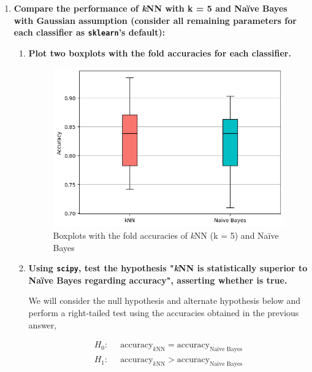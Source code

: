 \documentclass[12pt]{article}
\begin{document}
\begin{enumerate}[leftmargin=\labelsep]
  \item \textbf{Compare the performance of \textit{k}NN with k = 5 and Naïve Bayes with Gaussian assumption
          (consider all remaining parameters for each classifier as \texttt{sklearn}'s default):}
        \begin{enumerate}
          \item \textbf{Plot two boxplots with the fold accuracies for each classifier.}

                \vskip 0.3cm
                

                \begin{figure}[H]
                  \centering
                  \includegraphics[width=13cm]{./assets/boxplot_ex1_PartII.png}
                  \caption{Boxplots with the fold accuracies of \textit{k}NN (k = 5) and Naïve Bayes}
                  \label{fig:PartII-ex1a}
                \end{figure}

          \item \textbf{Using \texttt{scipy}, test the hypothesis "\textit{k}NN is statistically superior to Naïve Bayes regarding
                  accuracy", asserting whether is true.}

                \vskip 0.3cm
                We will consider the null hypothesis and alternate hypothesis below and perform a right-tailed test using the accuracies
                obtained in the previous answer,

                $$
                  \begin{aligned}
                    H_0: & \;\; \text{accuracy}_{k\text{NN}} = \text{accuracy}_{\text{Naïve Bayes}} \\
                    H_1: & \;\; \text{accuracy}_{k\text{NN}} > \text{accuracy}_{\text{Naïve Bayes}}
                  \end{aligned}
                $$


\end{enumerate}
\end{enumerate}
\end{document}
